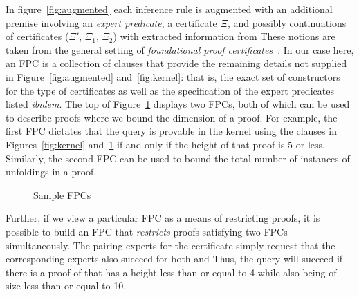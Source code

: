 In figure~\ref{fig:augmented}  each
inference rule is augmented with an additional premise involving an
\emph{expert predicate}, a certificate $\Xi$, and possibly continuations of
certificates ($\Xi'$, $\Xi_1$, $\Xi_2$) with extracted information from
These notions are taken from the general setting of \emph{foundational
  proof certificates}~\cite{chihani17jar}.
%
In our case here, an FPC is a collection of \lP clauses that
provide the remaining details not supplied in Figure~\ref{fig:augmented} and~\ref{fig:kernel}:
that is, the exact set of constructors for the  type of certificates as
well as the specification of the expert predicates listed \emph{ibidem}.
%
The top of Figure~\ref{fig:resources} displays two FPCs,
both of which can be used to describe proofs where we bound
the dimension of  a proof.
%
For example, the first FPC dictates that the query \mbox{} is
provable in  the kernel using the clauses in Figures~\ref{fig:kernel}
and~\ref{fig:resources} if and only if the height of that proof is 5
or less.
%
Similarly, the second FPC can be used to bound the total number of instances of
unfoldings in a proof.
%

\begin{figure}[t]


\caption{Sample FPCs}
\label{fig:resources}
\end{figure}

Further, if we view a particular FPC as a means of restricting proofs, it is
possible to build an FPC that \emph{restricts} proofs satisfying two FPCs
simultaneously.
%
%
The pairing experts for the certificate  simply
request that the corresponding experts also succeed for both
 and  
%
Thus, the query 
will succeed if there is a proof of  that has a height less
than or equal to 4 while also being of size less than or equal to 10.

